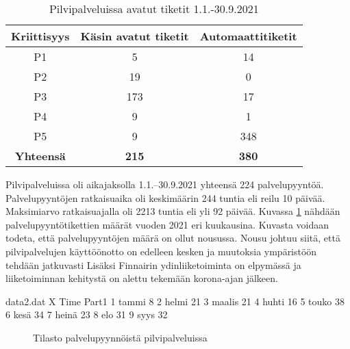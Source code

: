 \begin{table}[ht]
\centering
\begin{tabular}{||c c c||} 
 \hline
 Kriittisyys & Käsin avatut tiketit & Automaattitiketit \\ [0.5ex] 
 \hline\hline
 P1 & 5 & 14 \\ 
 P2 & 19 & 0 \\
 P3 & 173 & 17 \\
 P4 & 9 & 1 \\
 P5 & 9 & 348 \\
 \textbf{Yhteensä} & \textbf{215} & \textbf{380}\\ [1ex] 
 \hline
\end{tabular}
\caption{Pilvipalveluissa avatut tiketit 1.1.-30.9.2021}
\label{table:pilviautomaatti}
\end{table}

Pilvipalveluissa oli aikajaksolla 1.1.--30.9.2021 yhteensä 224 palvelupyyntöä. Palvelupyyntöjen ratkaisuaika oli keskimäärin 244 tuntia eli reilu 10 päivää. Maksimiarvo ratkaisuajalla oli 2213 tuntia eli yli 92 päivää. Kuvassa \ref{fig:pilvipyynto} nähdään palvelupyyntötikettien määrät vuoden 2021 eri kuukausina. Kuvasta voidaan todeta, että palvelupyyntöjen määrä on ollut nousussa. Nousu johtuu siitä, että pilvipalvelujen käyttöönotto on edelleen kesken ja muutoksia ympäristöön tehdään jatkuvasti Lisäksi Finnairin ydinliiketoiminta on elpymässä ja liiketoiminnan kehitystä on alettu tekemään korona-ajan jälkeen.

\begin{filecontents}{data2.dat}
X Time  	Part1
1 tammi  	8
2 helmi		21
3 maalis	21
4 huhti		16
5 touko		38
6 kesä		34
7 heinä		23
8 elo       31
9 syys      32
\end{filecontents}

\begin{figure}[ht]
\caption{Tilasto palvelupyynnöistä pilvipalveluissa}
\label{fig:pilvipyynto}
\end{figure}

